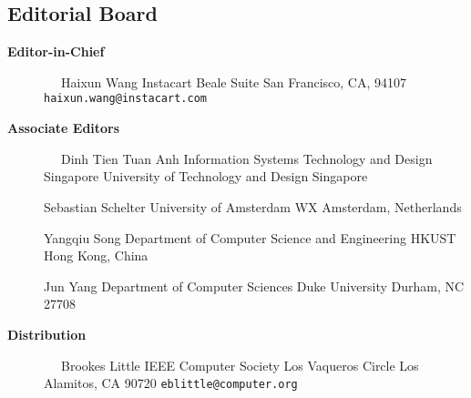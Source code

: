 \documentclass[10pt,twocolumn]{article}
\begin{document}
\pagestyle{empty}

\subsection*{Editorial Board}

\begin{description}
\item[{\bf Editor-in-Chief}]
\verb-  -                      \newline
Haixun Wang                 \newline
Instacart              Beale Suite\newline
San Francisco, CA, 94107\newline
\verb+haixun.wang@instacart.com+     \newline
\vspace{-.2cm}

\item[{\bf Associate Editors}] 
\verb-  -                     \newline
Dinh Tien Tuan Anh\newline
Information Systems Technology and Design\newline 
Singapore University of Technology and Design\newline
Singapore\newline

\vspace{-.4cm}

Sebastian Schelter\newline
University of Amsterdam WX Amsterdam, Netherlands\newline

\vspace{-.4cm}

Yangqiu Song\newline
Department of Computer Science and Engineering\newline
HKUST\newline
Hong Kong, China\newline

\vspace{-.4cm}
Jun Yang\newline
Department of Computer Sciences \newline 
Duke University\newline
Durham, NC 27708\newline
\vspace{-.4cm}

\item[{\bf Distribution}]      
\verb-  -                      \newline
Brookes Little           \newline
IEEE Computer Society           Los Vaqueros Circle       \newline
Los Alamitos, CA 90720     \newline
\verb+eblittle@computer.org+     \newline
\vspace{-.4cm}		            
\end{description}
\end{document}
